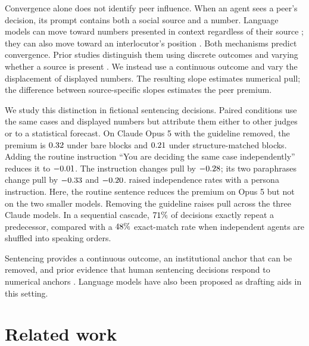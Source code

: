 \documentclass{article}
\begin{document}
Convergence alone does not identify peer influence. When an agent sees a peer's decision, its prompt
contains both a social source and a number. Language models can move toward numbers presented in
context regardless of their source \citep{jones2022capturing,echterhoff2024cognitive}; they can also
move toward an interlocutor's position \citep{sharma2024sycophancy}. Both mechanisms predict
convergence. Prior studies distinguish them using discrete outcomes and varying whether a source is
present \citep{hu2026conformity,zhong2025disentangling}. We instead use a continuous outcome and vary
the displacement of displayed numbers. The resulting slope estimates numerical pull; the difference
between source-specific slopes estimates the peer premium.

We study this distinction in fictional sentencing decisions. Paired conditions use the same cases
and displayed numbers but attribute them either to other judges or to a statistical forecast. On
Claude Opus 5 with the guideline removed, the premium is $0.32$ under bare blocks and $0.21$ under
structure-matched blocks. Adding the routine instruction ``You are deciding the same case
independently'' reduces it to $-0.01$. The instruction changes pull by $-0.28$; its two paraphrases
change pull by $-0.33$ and $-0.20$. \citet{weng2025conformity} raised independence rates with a
persona instruction. Here, the routine sentence reduces the premium on Opus 5 but not on the two
smaller models. Removing the guideline raises pull across the three Claude models. In a sequential
cascade, $71\%$ of decisions exactly repeat a predecessor, compared with a $48\%$
exact-match rate when independent agents are shuffled into speaking orders.

Sentencing provides a continuous outcome, an institutional anchor that can be removed, and prior
evidence that human sentencing decisions respond to numerical anchors
\citep{englich2006playing,guthrie2001inside}. Language models have also been proposed as drafting
aids in this setting.

\section{Related work}
\end{document}
